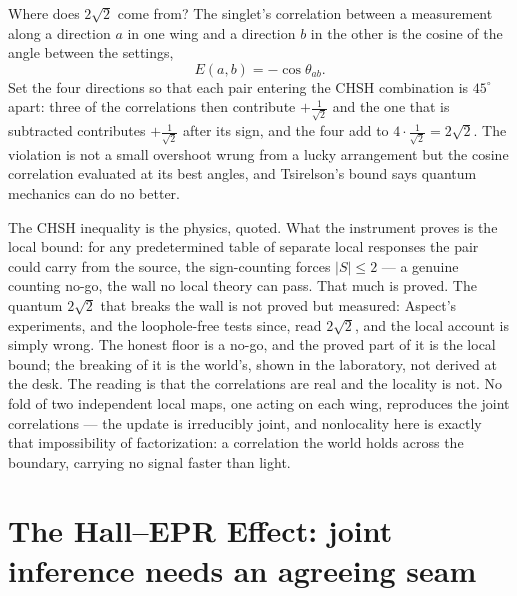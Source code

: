Where does $2\sqrt2$ come from? The singlet's correlation between a measurement along a direction $a$ in one
wing and a direction $b$ in the other is the cosine of the angle between the settings,
\begin{equation}
  E(a, b) = -\cos\theta_{ab}.
\end{equation}
Set the four directions so that each pair entering the CHSH combination is $45^\circ$ apart: three of the
correlations then contribute $+\tfrac{1}{\sqrt2}$ and the one that is subtracted contributes $+\tfrac{1}{\sqrt2}$
after its sign, and the four add to $4\cdot\tfrac{1}{\sqrt2} = 2\sqrt2$. The violation is not a small overshoot
wrung from a lucky arrangement but the cosine correlation evaluated at its best angles, and Tsirelson's bound
says quantum mechanics can do no better.

The CHSH inequality is the physics, quoted. What the instrument proves is the local bound: for any
predetermined table of separate local responses the pair could carry from the source, the sign-counting forces
$|S| \le 2$ --- a genuine counting no-go, the wall no local theory can pass. That much is proved. The quantum
$2\sqrt2$ that breaks the wall is not proved but measured: Aspect's experiments, and the loophole-free tests
since, read $2\sqrt2$, and the local account is simply wrong. The honest floor is a no-go, and the proved part
of it is the local bound; the breaking of it is the world's, shown in the laboratory, not derived at the desk.
The reading is that the correlations are real and the locality is not. No fold of two independent local maps,
one acting on each wing, reproduces the joint correlations --- the update is irreducibly joint, and nonlocality
here is exactly that impossibility of factorization: a correlation the world holds across the boundary,
carrying no signal faster than light.

\section{The Hall--EPR Effect: joint inference needs an agreeing seam}
\label{se:hall-epr}

